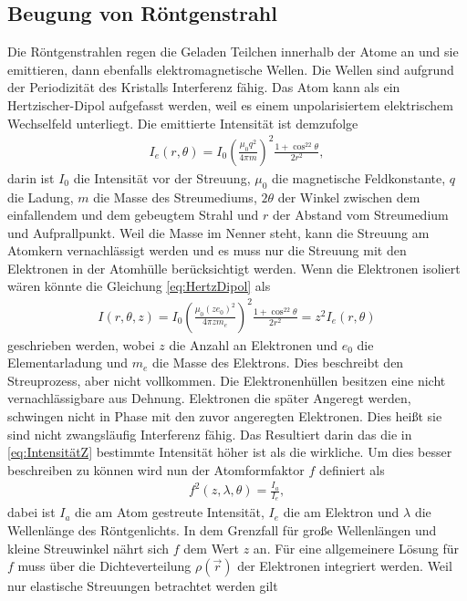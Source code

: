 \subsection{Beugung von Röntgenstrahl}
Die Röntgenstrahlen regen die Geladen Teilchen innerhalb der Atome an und sie emittieren, dann ebenfalls elektromagnetische Wellen. Die Wellen sind aufgrund der Periodizität des Kristalls Interferenz fähig. Das Atom kann als ein Hertzischer-Dipol aufgefasst werden, weil es einem unpolarisiertem elektrischem Wechselfeld unterliegt. Die emittierte Intensität ist demzufolge
\begin{align}
	I_e(r,\theta)=I_0\left(\frac{\mu_0q^2}{4\pi m}\right)^2\frac{1+\cos^22\theta}{2r^2} \label{eq:HertzDipol},
\end{align}
darin ist $I_0$ die Intensität vor der Streuung, $\mu_0$ die magnetische Feldkonstante, $q$ die Ladung, $m$ die Masse des Streumediums, $2\theta$ der Winkel zwischen dem einfallendem und dem gebeugtem Strahl und $r$ der Abstand vom Streumedium und Aufprallpunkt.
Weil die Masse im Nenner steht, kann die Streuung am Atomkern vernachlässigt werden und es muss nur die Streuung mit den Elektronen in der Atomhülle berücksichtigt werden. Wenn die Elektronen isoliert wären könnte die Gleichung \eqref{eq:HertzDipol} als
\begin{align}
	I\left(r,\theta,z\right)=I_0\left(\frac{\mu_0(ze_0)^2}{4\pi zm_e}\right)^2\frac{1+\cos^22\theta}{2r^2}=z^2I_e\left(r,\theta\right)\label{eq:IntensitätZ}
\end{align}
geschrieben werden, wobei $z$ die Anzahl an Elektronen und $e_0$ die Elementarladung und $m_e$ die Masse des Elektrons. Dies beschreibt den Streuprozess, aber nicht vollkommen. Die Elektronenhüllen besitzen eine nicht vernachlässigbare aus Dehnung. Elektronen die später Angeregt werden, schwingen nicht in Phase mit den zuvor angeregten Elektronen. Dies heißt sie sind nicht zwangsläufig Interferenz fähig. Das Resultiert darin das die in \eqref{eq:IntensitätZ} bestimmte Intensität höher ist als die wirkliche. Um dies besser beschreiben zu können wird nun der Atomformfaktor $f$ definiert als
\begin{align}
	f^2\left(z,\lambda,\theta\right)=\frac{I_a}{I_e},
\end{align}
dabei ist $I_a$ die am Atom gestreute Intensität, $I_e$ die am Elektron und $\lambda$ die Wellenlänge des Röntgenlichts. In dem Grenzfall für große Wellenlängen und kleine Streuwinkel nährt sich $f$ dem Wert $z$ an. Für eine allgemeinere Lösung für $f$ muss über die Dichteverteilung $\rho (\vec{r})$ der Elektronen integriert werden. Weil nur elastische Streuungen betrachtet werden gilt 
